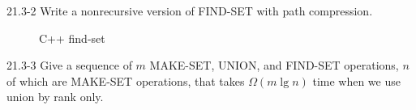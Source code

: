 \begin{problem}{21.3-2}
  Write a nonrecursive version of FIND-SET with path compression.
  \begin{solution}
    \begin{figure}[H]
      \centering
      \caption{C++ find-set}
      
    \end{figure}
  \end{solution}
\end{problem}

\begin{problem}{21.3-3}
  Give a sequence of $m$ MAKE-SET, UNION, and FIND-SET operations, $n$ of which are MAKE-SET operations, that takes
  $\Omega(m \lg n)$ time when we use union by rank only.
\end{problem}


